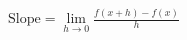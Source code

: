 \documentclass[preview]{standalone}
\begin{document}
\begin{align*}
\text{Slope} = \lim_{h \to 0} \frac{f(x+h) - f(x)}{h}
\end{align*}
\end{document}
